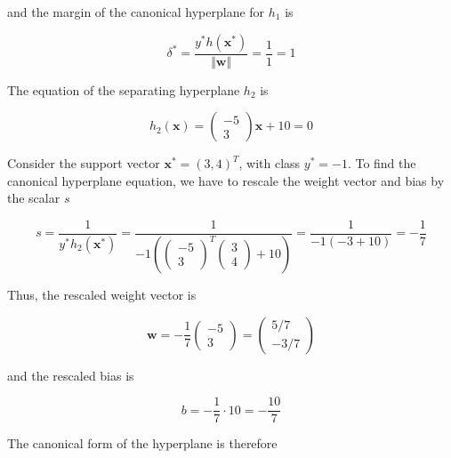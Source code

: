 \documentclass[11pt]{article}
\begin{document}
\begin{enumerate}
\begin{enumerate}
and the margin of the canonical hyperplane for $h_1$ is

\begin{equation*}
\delta^*
=
\frac{y^*h(\mathbf{x}^*)}{\Vert \mathbf{w} \Vert}
=
\frac{1}{1}
=
1
\end{equation*}

The equation of the separating hyperplane $h_2$ is

\begin{equation*}
h_2(\mathbf{x}) = \left( \begin{array}{c} -5 \\ 3 \end{array} \right) \mathbf{x} + 10 = 0
\end{equation*}

Consider the support vector $\mathbf{x}^* = (3,4)^\mathit{T}$, with class $y^* = -1$. To find the canonical hyperplane equation, we have to rescale the weight vector and bias by the scalar $s$

\begin{equation*}
s = \frac{1}{y^*h_2(\mathbf{x}^*)} = \frac{1}{-1\left(
\left(
\begin{array}{c}
-5 \\ 3
\end{array}
\right)^\mathit{T}
\left(
\begin{array}{c}
3 \\ 4
\end{array}
\right) + 10 \right)}
=
\frac{1}{-1 (-3 + 10)}
=
-\frac{1}{7}
\end{equation*}

Thus, the rescaled weight vector is

\begin{equation*}
\mathbf{w} = -\frac{1}{7}
\left(
\begin{array}{c}
-5 \\ 3
\end{array}
\right)
=
\left(
\begin{array}{c}
5/7 \\ -3/7
\end{array}
\right)
\end{equation*}

and the rescaled bias is

\begin{equation*}
b = -\frac{1}{7} \cdot 10 = -\frac{10}{7}
\end{equation*}

The canonical form of the hyperplane is therefore


\end{enumerate}
\end{enumerate}
\end{document}
